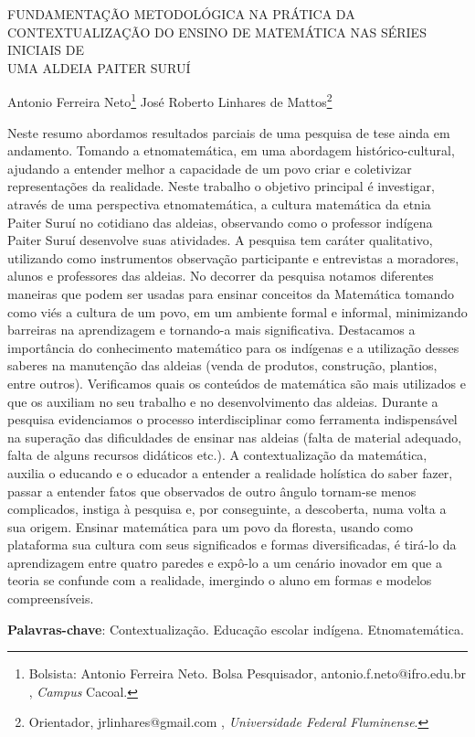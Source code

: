 \documentclass[article,12pt,onesidea,4paper,english,brazil]{abntex2}
\begin{document}
	
	
	\frenchspacing 
	
	\begin{center}
		\LARGE FUNDAMENTAÇÃO METODOLÓGICA NA PRÁTICA DA CONTEXTUALIZAÇÃO
		DO ENSINO DE MATEMÁTICA NAS SÉRIES INICIAIS DE\\UMA ALDEIA PAITER
		SURUÍ
		
		\normalsize
		Antonio Ferreira Neto\footnote{Bolsista: Antonio Ferreira Neto. Bolsa Pesquisador, antonio.f.neto@ifro.edu.br , \textit{Campus} Cacoal.} 
		José Roberto Linhares de Mattos\footnote{Orientador, jrlinhares@gmail.com , \textit{Universidade Federal Fluminense}.} 
	\end{center}
	
	\noindent Neste resumo abordamos resultados parciais de uma pesquisa de tese ainda em
	andamento. Tomando a etnomatemática, em uma abordagem histórico-cultural,
	ajudando a entender melhor a capacidade de um povo criar e coletivizar
	representações da realidade. Neste trabalho o objetivo principal é investigar, através
	de uma perspectiva etnomatemática, a cultura matemática da etnia Paiter Suruí no
	cotidiano das aldeias, observando como o professor indígena Paiter Suruí
	desenvolve suas atividades. A pesquisa tem caráter qualitativo, utilizando como
	instrumentos observação participante e entrevistas a moradores, alunos e
	professores das aldeias. No decorrer da pesquisa notamos diferentes maneiras que
	podem ser usadas para ensinar conceitos da Matemática tomando como viés a
	cultura de um povo, em um ambiente formal e informal, minimizando barreiras na
	aprendizagem e tornando-a mais significativa. Destacamos a importância do
	conhecimento matemático para os indígenas e a utilização desses saberes na
	manutenção das aldeias (venda de produtos, construção, plantios, entre outros).
	Verificamos quais os conteúdos de matemática são mais utilizados e que os auxiliam
	no seu trabalho e no desenvolvimento das aldeias. Durante a pesquisa
	evidenciamos o processo interdisciplinar como ferramenta indispensável na
	superação das dificuldades de ensinar nas aldeias (falta de material adequado, falta
	de alguns recursos didáticos etc.). A contextualização da matemática, auxilia o
	educando e o educador a entender a realidade holística do saber fazer, passar a
	entender fatos que observados de outro ângulo tornam-se menos complicados,
	instiga à pesquisa e, por conseguinte, a descoberta, numa volta a sua origem.
	Ensinar matemática para um povo da floresta, usando como plataforma sua cultura
	com seus significados e formas diversificadas, é tirá-lo da aprendizagem entre
	quatro paredes e expô-lo a um cenário inovador em que a teoria se confunde com a
	realidade, imergindo o aluno em formas e modelos compreensíveis.
	
	\vspace{\onelineskip}
	
	\noindent
	\textbf{Palavras-chave}: Contextualização. Educação escolar indígena. Etnomatemática.
	
\end{document}
